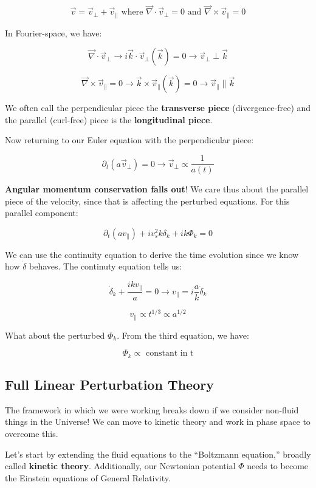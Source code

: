 \documentclass{article}
\newcommand{\be}{\begin{equation}}
\newcommand{\ee}{\end{equation}}
\begin{document}
\be
\vec{v} = \vec{v}_\perp + \vec{v}_\parallel \text{ where } \vec{\nabla}\cdot \vec{v}_\perp = 0 \text{ and } \vec{\nabla}\times \vec{v}_\parallel = 0
\ee

In Fourier-space, we have:

\be
\vec{\nabla} \cdot \vec{v}_\perp \rightarrow i \vec{k} \cdot \vec{v}_\perp \left(\vec{k}\right) = 0 \rightarrow \vec{v}_\perp \perp \vec{k}
\ee

\be
\vec{\nabla} \times \vec{v}_\parallel = 0 \rightarrow \vec{k} \times \vec{v}_\parallel \left(\vec{k}\right) = 0 \rightarrow \vec{v}_\parallel \parallel \vec{k}
\ee

We often call the perpendicular piece the \textbf{transverse piece} (divergence-free) and the parallel (curl-free) piece is the \textbf{longitudinal piece}. 

Now returning to our Euler equation with the perpendicular piece:

\be
\partial_t \left(a \vec{v}_\perp\right) = 0 \rightarrow \vec{v}_\perp \propto \frac{1}{a(t)}
\ee

\textbf{Angular momentum conservation falls out}! We care thus about the parallel piece of the velocity, since that is affecting the perturbed equations. For this parallel component:

\be
\partial_t \left(a v_\parallel\right) + i v_s^2 k \delta_k + i k\Phi_k = 0
\ee

We can use the continuity equation to derive the time evolution since we know how $\dot{\delta}$ behaves. The continuty equation tells us:

\be
\dot{\delta}_k + \frac{i k v_\parallel}{a} = 0 \rightarrow v_\parallel = i \frac{a}{k} \dot{\delta}_k
\ee

\be
v_\parallel \propto t^{1/3} \propto a^{1/2}
\ee

What about the perturbed $\Phi_k$. From the third equation, we have:

\be
\Phi_k \propto \text{ constant in t} 
\ee

\subsection{Full Linear Perturbation Theory}

The framework in which we were working breaks down if we consider non-fluid things in the Universe! We can move to kinetic theory and work in phase space to overcome this.

Let's start by extending the fluid equations to the ``Boltzmann equation,'' broadly called \textbf{kinetic theory}. Additionally, our Newtonian potential $\Phi$ needs to become the Einstein equations of General Relativity.
\end{document}
